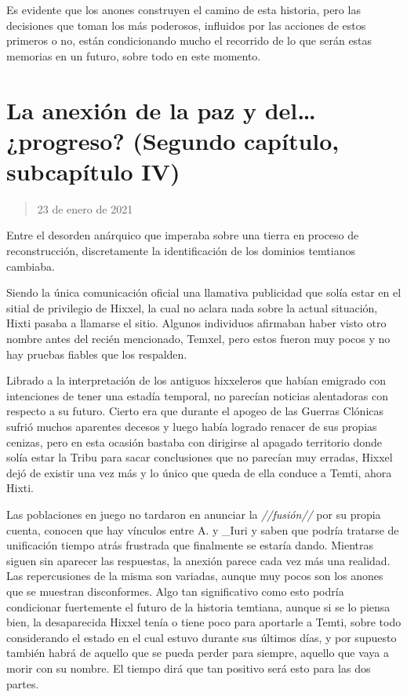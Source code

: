 \documentclass[
  spanish,
]{book}
\begin{document}
Es evidente que los anones construyen el camino de esta historia, pero las decisiones que toman los más poderosos, influidos por las acciones de estos primeros o no, están condicionando mucho el recorrido de lo que serán estas memorias en un futuro, sobre todo en este momento.

\hypertarget{la-anexiuxf3n-de-la-paz-y-del-progreso-segundo-capuxedtulo-subcapuxedtulo-iv}{%
\section{La anexión de la paz y del\ldots{} ¿progreso? (Segundo capítulo, subcapítulo IV)}\label{la-anexiuxf3n-de-la-paz-y-del-progreso-segundo-capuxedtulo-subcapuxedtulo-iv}}

\begin{quote}
23 de enero de 2021
\end{quote}

Entre el desorden anárquico que imperaba sobre una tierra en proceso de reconstrucción, discretamente la identificación de los dominios temtianos cambiaba.

Siendo la única comunicación oficial una llamativa publicidad que solía estar en el sitial de privilegio de Hixxel, la cual no aclara nada sobre la actual situación, Hixti pasaba a llamarse el sitio. Algunos individuos afirmaban haber visto otro nombre antes del recién mencionado, Temxel, pero estos fueron muy pocos y no hay pruebas fiables que los respalden.

Librado a la interpretación de los antiguos hixxeleros que habían emigrado con intenciones de tener una estadía temporal, no parecían noticias alentadoras con respecto a su futuro.
Cierto era que durante el apogeo de las Guerras Clónicas sufrió muchos aparentes decesos y luego había logrado renacer de sus propias cenizas, pero en esta ocasión bastaba con dirigirse al apagado territorio donde solía estar la Tribu para sacar conclusiones que no parecían muy erradas, Hixxel dejó de existir una vez más y lo único que queda de ella conduce a Temti, ahora Hixti.

Las poblaciones en juego no tardaron en anunciar la \emph{//fusión//} por su propia cuenta, conocen que hay vínculos entre A. y \_Iuri y saben que podría tratarse de unificación tiempo atrás frustrada que finalmente se estaría dando.
Mientras siguen sin aparecer las respuestas, la anexión parece cada vez más una realidad.
Las repercusiones de la misma son variadas, aunque muy pocos son los anones que se muestran disconformes. Algo tan significativo como esto podría condicionar fuertemente el futuro de la historia temtiana, aunque si se lo piensa bien, la desaparecida Hixxel tenía o tiene poco para aportarle a Temti, sobre todo considerando el estado en el cual estuvo durante sus últimos días, y por supuesto también habrá de aquello que se pueda perder para siempre, aquello que vaya a morir con su nombre.
El tiempo dirá que tan positivo será esto para las dos partes.
\end{document}
